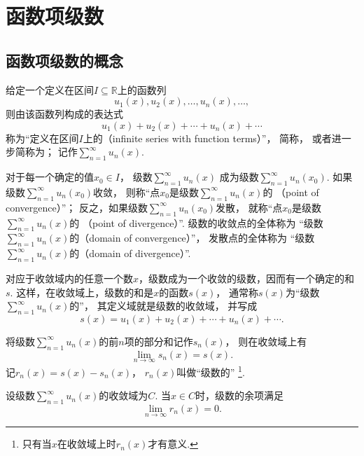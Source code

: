 \section{函数项级数}
\subsection{函数项级数的概念}
\begin{definition}\label{definition:无穷级数.实函数项级数的概念}
给定一个定义在区间\(I \subseteq \mathbb{R}\)上的函数列\[
	u_1(x),u_2(x),\dotsc,u_n(x),\dotsc,
\]
则由该函数列构成的表达式\[
	u_1(x)+u_2(x)+\dotsb+u_n(x)+\dotsb
\]
称为“定义在区间\(I\)上的（infinite series with function terms）”，
简称，
或者进一步简称为；
记作\(\sum\limits_{n=1}^\infty u_n(x)\).

对于每一个确定的值\(x_0 \in I\)，
级数\(\sum\limits_{n=1}^\infty u_n(x)\)
成为级数\(\sum\limits_{n=1}^\infty u_n(x_0)\).
如果级数\(\sum\limits_{n=1}^\infty u_n(x_0)\)收敛，
则称“点\(x_0\)是级数\(\sum\limits_{n=1}^\infty u_n(x)\)的
（point of convergence）”；
反之，如果级数\(\sum\limits_{n=1}^\infty u_n(x_0)\)发散，
就称“点\(x_0\)是级数\(\sum\limits_{n=1}^\infty u_n(x)\)的
（point of divergence）”.
级数的收敛点的全体称为
“级数\(\sum\limits_{n=1}^\infty u_n(x)\)的（domain of convergence）”，
发散点的全体称为
“级数\(\sum\limits_{n=1}^\infty u_n(x)\)的（domain of divergence）”.

对应于收敛域内的任意一个数\(x\)，级数成为一个收敛的级数，因而有一个确定的和\(s\).
这样，在收敛域上，级数的和是\(x\)的函数\(s(x)\)，
通常称\(s(x)\)为“级数\(\sum\limits_{n=1}^\infty u_n(x)\)的”，
其定义域就是级数的收敛域，
并写成\[
	s(x) = u_1(x)+u_2(x)+\dotsb+u_n(x)+\dotsb.
\]

将级数\(\sum\limits_{n=1}^\infty u_n(x)\)的前\(n\)项的部分和记作\(s_n(x)\)，
则在收敛域上有\[
	\lim\limits_{n\to\infty} s_n(x) = s(x).
\]
记\(r_n(x) = s(x)-s_n(x)\)，
\(r_n(x)\)叫做“级数的”%
\footnote{只有当\(x\)在收敛域上时\(r_n(x)\)才有意义.}.
\end{definition}

\begin{property}
设级数\(\sum\limits_{n=1}^\infty u_n(x)\)的收敛域为\(C\).
当\(x \in C\)时，级数的余项满足\[
	\lim\limits_{n\to\infty} r_n(x) = 0.
\]
\end{property}
